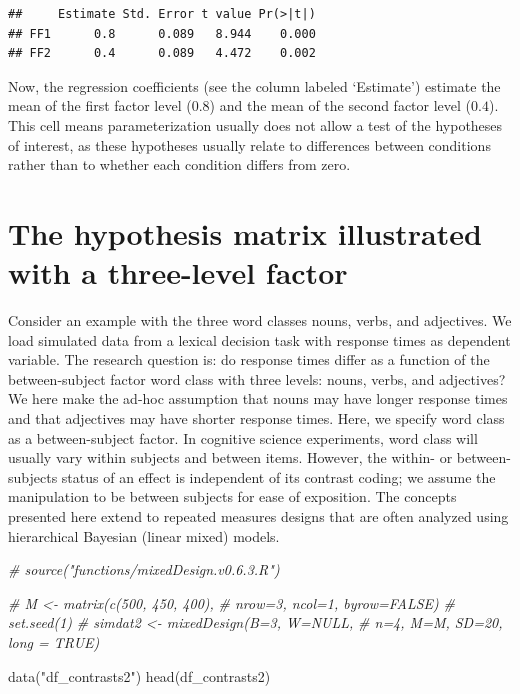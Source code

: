 \documentclass[
  12pt,
]{krantz}
\newenvironment{Shaded}{\begin{snugshade}}{\end{snugshade}}
\newcommand{\CommentTok}[1]{\textcolor[rgb]{0.56,0.35,0.01}{\textit{#1}}}
\newcommand{\FunctionTok}[1]{\textcolor[rgb]{0.00,0.00,0.00}{#1}}
\newcommand{\NormalTok}[1]{#1}
\newcommand{\StringTok}[1]{\textcolor[rgb]{0.31,0.60,0.02}{#1}}
\theoremstyle{definition}
\theoremstyle{definition}
\theoremstyle{definition}
\theoremstyle{definition}
\theoremstyle{remark}
\begin{document}
\begin{verbatim}
##     Estimate Std. Error t value Pr(>|t|)
## FF1      0.8      0.089   8.944    0.000
## FF2      0.4      0.089   4.472    0.002
\end{verbatim}

Now, the regression coefficients (see the column labeled `Estimate') estimate the mean of the first factor level (\(0.8\)) and the mean of the second factor level (\(0.4\)). This cell means parameterization usually does not allow a test of the hypotheses of interest, as these hypotheses usually relate to differences between conditions rather than to whether each condition differs from zero.

\hypertarget{the-hypothesis-matrix-illustrated-with-a-three-level-factor}{%
\section{The hypothesis matrix illustrated with a three-level factor}\label{the-hypothesis-matrix-illustrated-with-a-three-level-factor}}

Consider an example with the three word classes nouns, verbs, and adjectives. We load simulated data from a lexical decision task with response times as dependent variable. The research question is: do response times differ as a function of the between-subject factor word class with three levels: nouns, verbs, and adjectives? We here make the ad-hoc assumption that nouns may have longer response times and that adjectives may have shorter response times. Here, we specify word class as a between-subject factor. In cognitive science experiments, word class will usually vary within subjects and between items. However, the within- or between-subjects status of an effect is independent of its contrast coding; we assume the manipulation to be between subjects for ease of exposition. The concepts presented here extend to repeated measures designs that are often analyzed using hierarchical Bayesian (linear mixed) models.

\begin{Shaded}
\begin{Highlighting}[]
\CommentTok{\# source("functions/mixedDesign.v0.6.3.R")}

\CommentTok{\# M \textless{}{-} matrix(c(500, 450, 400),}
\CommentTok{\#            nrow=3, ncol=1, byrow=FALSE)}
\CommentTok{\# set.seed(1)}
\CommentTok{\# simdat2 \textless{}{-} mixedDesign(B=3, W=NULL,}
\CommentTok{\#                       n=4, M=M,  SD=20, long = TRUE)}

\FunctionTok{data}\NormalTok{(}\StringTok{"df\_contrasts2"}\NormalTok{)}
\FunctionTok{head}\NormalTok{(df\_contrasts2)}
\end{Highlighting}
\end{Shaded}
\end{document}
